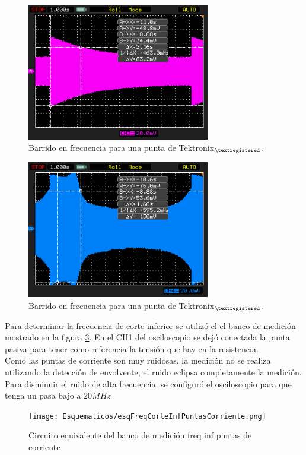 \documentclass[a4paper,10pt]{article}
\begin{document}
		\begin{figure}[!htb]
			\centering
			\includegraphics[width=8cm]
			{Imagenes/Mediciones instrumentos/NewFile7.png}
			\caption{Barrido en frecuencia para una punta de 
			Tektronix$_{\textregistered}$.} \label{img006}
		\end{figure}		
	
		\begin{figure}[!htb]
			\centering
			\includegraphics[width=8cm]
			{Imagenes/Mediciones instrumentos/NewFile8.png}
			\caption{Barrido en frecuencia para una punta de 
			Tektronix$_{\textregistered}$.} \label{img007}
		\end{figure}
	
		\indent Para determinar la frecuencia de corte inferior se utilizó el
		el banco de medición mostrado en la figura \ref{esq003}. En el CH1 del
		osciloscopio se dejó conectada la punta pasiva para tener como 
		referencia la tensión que hay en la resistencia. \\
		\indent Como las puntas de corriente son muy ruidosas, la medición no
		se realiza utilizando la detección de envolvente, el ruido eclipsa 
		completamente la medición. Para disminuir el ruido de alta frecuencia,
		se configuró el osciloscopio para que tenga un pasa bajo a $20 MHz$\\

		\begin{figure}[!htb]
			\centering
			\texttt{[image: Esquematicos/esqFreqCorteInfPuntasCorriente.png]}
			\caption{Circuito equivalente del banco de medición freq inf 
			puntas de corriente}
		    \label{esq003}
		\end{figure}
\end{document}
